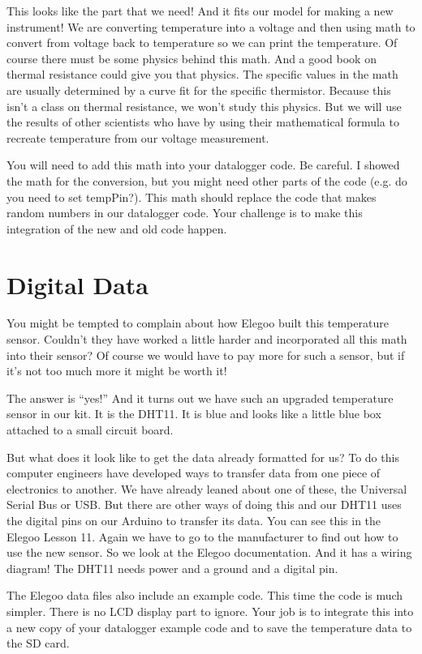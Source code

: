 This looks like the part that we need! And it fits our model for making a new instrument! We are converting temperature into a voltage and then using math to convert from voltage back to temperature so we can print the temperature. Of course there must be some physics behind this math. And a good book on thermal resistance could give you that physics. The specific values in the math are usually determined by a curve fit for the specific thermistor.  Because this isn't a class on thermal resistance, we won't study this physics. But we will use the results of other scientists who have by using their mathematical formula to recreate temperature from our voltage measurement.

You will need to add this math into your datalogger code.  Be careful.  I showed the math for the conversion, but you might need other parts of the code (e.g. do you need to set tempPin?). This math should replace the code that makes random numbers in our datalogger code.  Your challenge is to make this integration of the new and old code happen.

\section{Digital Data}
You might be tempted to complain about how Elegoo built this temperature sensor.  Couldn't they have worked a little harder and incorporated all this math into their sensor?  Of course we would have to pay more for such a sensor, but if it's not too much more it might be worth it!  

The answer is ``yes!'' And it turns out we have such an upgraded temperature sensor in our kit.  It is the DHT11.  It is blue and looks like a little blue box attached to a small circuit board.  

But what does it look like to get the data already formatted for us?  To do this computer engineers have developed ways to transfer data from one piece of electronics to another. We have already leaned about one of these, the Universal Serial Bus or USB.  But there are other ways of doing this and our DHT11 uses the digital pins on our Arduino to transfer its data. You can see this in the Elegoo Lesson 11. Again we have to go to the manufacturer to find out how to use the new sensor.  So we look at the Elegoo documentation. And it has a wiring diagram! The DHT11 needs power and a ground and a digital pin.

The Elegoo data files also include an example code. This time the code is much simpler. There is no LCD display part to ignore.  Your job is to integrate this into a new copy of your datalogger example code and to save the temperature data to the SD card.

